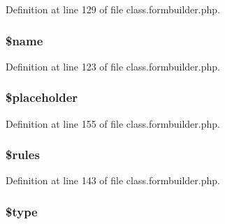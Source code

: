 Definition at line 129 of file class.\-formbuilder.\-php.

\hypertarget{class_form_builder_field_ab2fc40d43824ea3e1ce5d86dee0d763b}{
\subsubsection[{\$name}]{\setlength{\rightskip}{0pt plus 5cm}\$name}}\label{class_form_builder_field_ab2fc40d43824ea3e1ce5d86dee0d763b}


Definition at line 123 of file class.\-formbuilder.\-php.

\hypertarget{class_form_builder_field_a8eaeb0b5f26eeebf5508f97b7321cc0e}{
\subsubsection[{\$placeholder}]{\setlength{\rightskip}{0pt plus 5cm}\$placeholder}}\label{class_form_builder_field_a8eaeb0b5f26eeebf5508f97b7321cc0e}


Definition at line 155 of file class.\-formbuilder.\-php.

\hypertarget{class_form_builder_field_a811d22ac55b4592f7f2a202529629419}{
\subsubsection[{\$rules}]{\setlength{\rightskip}{0pt plus 5cm}\$rules}}\label{class_form_builder_field_a811d22ac55b4592f7f2a202529629419}


Definition at line 143 of file class.\-formbuilder.\-php.

\hypertarget{class_form_builder_field_a9a4a6fba2208984cabb3afacadf33919}{
\subsubsection[{\$type}]{\setlength{\rightskip}{0pt plus 5cm}\$type}}\label{class_form_builder_field_a9a4a6fba2208984cabb3afacadf33919}


